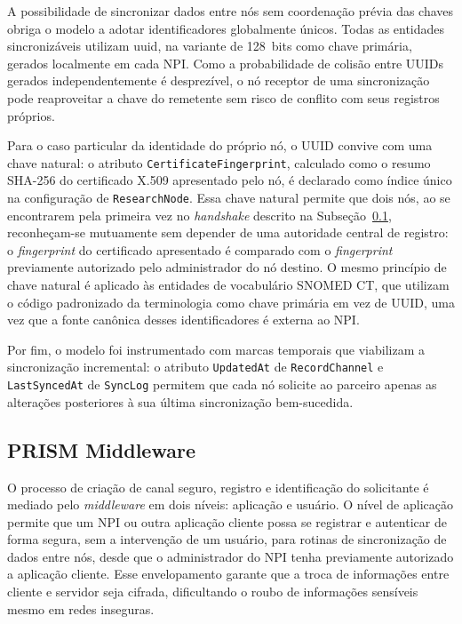 A possibilidade de sincronizar dados entre nós sem coordenação prévia das chaves obriga o modelo a adotar identificadores globalmente únicos. Todas as entidades sincronizáveis utilizam \gls{uuid}, na variante de 128~bits \cite{rfc9562} como chave primária, gerados localmente em cada NPI. Como a probabilidade de colisão entre UUIDs gerados independentemente é desprezível, o nó receptor de uma sincronização pode reaproveitar a chave do remetente sem risco de conflito com seus registros próprios.

Para o caso particular da identidade do próprio nó, o UUID convive com uma chave natural: o atributo \texttt{CertificateFingerprint}, calculado como o resumo SHA-256 \cite{nistfips1804} do certificado X.509 apresentado pelo nó, é declarado como índice único na configuração de \texttt{ResearchNode}. Essa chave natural permite que dois nós, ao se encontrarem pela primeira vez no \textit{handshake} descrito na Subseção~\ref{subsec:NPIMiddleware}, reconheçam-se mutuamente sem depender de uma autoridade central de registro: o \textit{fingerprint} do certificado apresentado é comparado com o \textit{fingerprint} previamente autorizado pelo administrador do nó destino. O mesmo princípio de chave natural é aplicado às entidades de vocabulário SNOMED CT, que utilizam o código padronizado da terminologia como chave primária em vez de UUID, uma vez que a fonte canônica desses identificadores é externa ao NPI.

Por fim, o modelo foi instrumentado com marcas temporais que viabilizam a sincronização incremental: o atributo \texttt{UpdatedAt} de \texttt{RecordChannel} e \texttt{LastSyncedAt} de \texttt{SyncLog} permitem que cada nó solicite ao parceiro apenas as alterações posteriores à sua última sincronização bem-sucedida.

\subsection{PRISM Middleware}\label{subsec:NPIMiddleware}

O processo de criação de canal seguro, registro e identificação do solicitante é mediado pelo \textit{middleware} em dois níveis: aplicação e usuário. O nível de aplicação permite que um NPI ou outra aplicação cliente possa se registrar e autenticar de forma segura, sem a intervenção de um usuário, para rotinas de sincronização de dados entre nós, desde que o administrador do NPI tenha previamente autorizado a aplicação cliente. Esse envelopamento garante que a troca de informações entre cliente e servidor seja cifrada, dificultando o roubo de informações sensíveis mesmo em redes inseguras.


